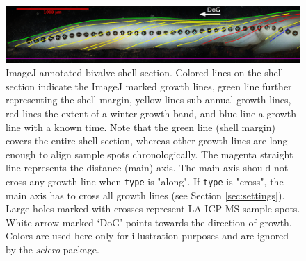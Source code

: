 \documentclass[11pt, a4paper]{article}
\newcommand{\sclero}{\textit{sclero}\xspace}
\begin{document}
\begin{figure}[H]
\includegraphics[width=1\textwidth]{marked_shell.pdf}
\caption{ImageJ annotated bivalve shell section. Colored lines on the shell section indicate the ImageJ marked growth lines, green line further representing the shell margin, yellow lines sub-annual growth lines, red lines the extent of a winter growth band, and blue line a growth line with a known time. Note that the green line (shell margin) covers the entire shell section, whereas other growth lines are long enough to align sample spots chronologically. The magenta straight line represents the distance (main) axis. The main axis should not cross any growth line when \texttt{type} is "along". If \texttt{type} is "cross", the main axis has to cross all growth lines (see Section \ref{sec:settings}). Large holes marked with crosses represent LA-ICP-MS sample spots. White arrow marked `DoG' points towards the direction of growth. Colors are used here only for illustration purposes and are ignored by the \sclero package.}
\label{Fig:marked}
\end{figure}
\end{document}
